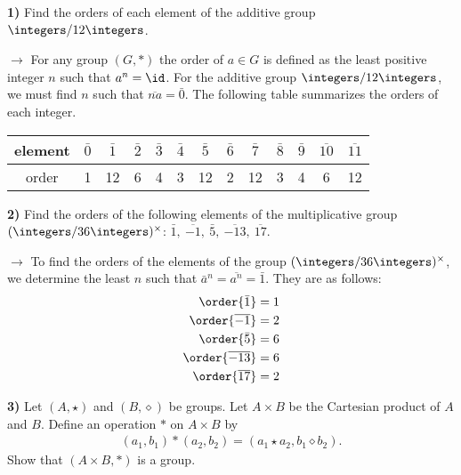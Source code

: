 \documentclass[12pt,a4paper]{article}
\newcommand{\prob}[2]{\textbf{#1)} #2}
\begin{document}
\prob{1}{Find the orders of each element of the additive group $\integers/12\integers$.}

$\rightarrow$ For any group $(G,*)$ the order of $a \in G$ is defined as the least positive integer $n$ such that $a^n = \id$. For the additive group $\integers/12\integers$, we must find $n$ such that $\overline{na} = \bar{0}$. The following table summarizes the orders of each integer.

\begin{table}[H]
\begin{center}
\begin{tabular}{|c|c|c|c|c|c|c|c|c|c|c|c|c|}
\hline
element & $\bar{0}$ & $\bar{1}$ & $\bar{2}$ & $\bar{3}$ & $\bar{4}$ & $\bar{5}$ & $\bar{6}$ & $\bar{7}$ & $\bar{8}$ & $\bar{9}$ & $\overline{10}$ & $\overline{11}$ \\
\hline
order & 1 & 12 & 6 & 4 & 3 & 12 & 2 & 12 & 3 & 4 & 6 & 12 \\
\hline
\end{tabular}
\end{center}
\end{table}

\prob{2}{Find the orders of the following elements of the multiplicative group $(\integers/36\integers)^{\times}$: $\bar{1},~\overline{-1},~\bar{5},~\overline{-13},~\overline{17}$.}

$\rightarrow$ To find the orders of the elements of the group $(\integers/36\integers)^{\times}$, we determine the least $n$ such that $\bar{a}^n = \overline{a^n} = \bar{1}$. They are as follows:
\begin{align*}
\order{\bar{1}} &= 1 \\
\order{\overline{-1}} &= 2 \\
\order{\bar{5}} &= 6 \\
\order{\overline{-13}} &= 6 \\
\order{\overline{17}} &= 2
\end{align*}

\prob{3}{Let $(A,\star)$ and $(B,\diamond)$ be groups. Let $A \times B$ be the Cartesian product of $A$ and $B$. Define an operation $*$ on $A \times B$ by
\begin{align*}
(a_1,b_1) * (a_2,b_2) = (a_1 \star a_2, b_1 \diamond b_2).
\end{align*}
Show that $(A \times B,*)$ is a group.}
\end{document}

